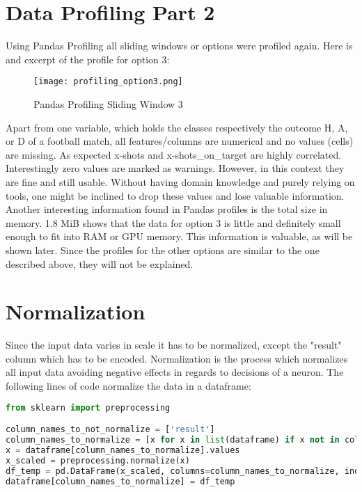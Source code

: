 \section {Data Profiling Part 2}

Using Pandas Profiling all sliding windows or options were profiled again. Here is and excerpt of the profile for option 3:

\begin{figure}[H]
\begin{center}
\texttt{[image: profiling\_option3.png]}
\end{center}
\caption{Pandas Profiling Sliding Window 3}
\label{fig:profiling_option3}
\end{figure}

Apart from one variable, which holds the classes respectively the outcome H, A, or D of a football match, all features/columns are numerical and no values (cells) are missing. As expected x-shots and x-shots\_on\_target are highly 
correlated. Interestingly zero values are marked as warnings. However, in this context they are fine and still usable. Without having domain knowledge and purely relying on tools, one might be inclined to drop these values and lose valuable information. Another interesting information found in Pandas profiles is the total size in memory. 1.8 MiB shows that the data for option 3 is little and definitely small enough to fit into RAM or GPU memory. This information is valuable, as will be shown later.
\newline
Since the profiles for the other options are similar to the one described above, they will not be explained.

\section {Normalization}
Since the input data varies in scale it has to be normalized, except the "result" column which has to be encoded. Normalization is the process which normalizes all input data avoiding negative effects in regards to decisions of a neuron. 
The following lines of code normalize the data in a dataframe:

\begin{lstlisting}[language=Python, caption=Python code for normalization]
from sklearn import preprocessing

column_names_to_not_normalize = ['result']
column_names_to_normalize = [x for x in list(dataframe) if x not in column_names_to_not_normalize ]
x = dataframe[column_names_to_normalize].values
x_scaled = preprocessing.normalize(x)
df_temp = pd.DataFrame(x_scaled, columns=column_names_to_normalize, index = dataframe.index)
dataframe[column_names_to_normalize] = df_temp
\end{lstlisting}


